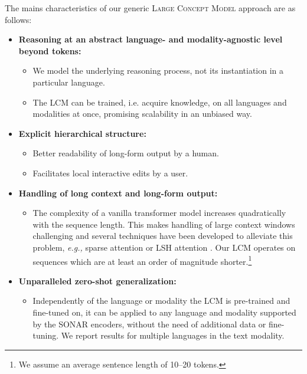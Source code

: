 \documentclass[twoside,11pt]{fairmeta}
\newcommand{\sonar}{\textsc{SONAR}\xspace}
\newcommand{\lcm}{\textsc{LCM}\xspace}
\newcommand{\LCM}{\textsc{Large Concept Model}\xspace}
\newcommand{\eg}{\textit{e.g.,}\xspace}
\begin{document}
\newpage %
The mains characteristics of our generic \LCM approach are as follows:
\begin{itemize}[style=unboxed,leftmargin=*]
    \item \textbf{Reasoning at an abstract language- and modality-agnostic level beyond tokens:}
        \begin{itemize}[style=unboxed,leftmargin=*]
             \item We model the underlying reasoning process, not its instantiation in a particular language.
             \item The \lcm can be trained, i.e. acquire knowledge, on all languages and modalities at once, promising scalability in an unbiased way.
        \end{itemize}
    \item \textbf{Explicit hierarchical structure:}
        \begin{itemize}[style=unboxed,leftmargin=*]
            \item Better readability of long-form output by a human.
            \item Facilitates local interactive edits by a user.
        \end{itemize}
    \item \textbf{Handling of long context and long-form output:}
        \begin{itemize}[style=unboxed,leftmargin=*]
            \item The complexity of a vanilla transformer model increases quadratically with the sequence length. This makes handling of large context windows challenging and several techniques have been developed to alleviate this problem, \eg sparse attention \citep{child2019generating} or LSH attention \citep{kitaev2020reformer}.
            Our \lcm operates on sequences which are at least an order of magnitude shorter.\footnote{We assume an average sentence length of 10--20 tokens.}
        \end{itemize}
    \item \textbf{Unparalleled zero-shot generalization:}
        \begin{itemize}[style=unboxed,leftmargin=*]
            \item Independently of the language or modality the \lcm is pre-trained and fine-tuned on, it can be applied to any language and modality supported by the \sonar encoders, without the need of additional data or fine-tuning. We report results for multiple languages in the text modality.
        \end{itemize}

\end{itemize}
\end{document}
